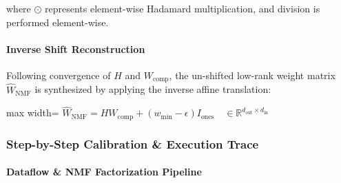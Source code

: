 where $\odot$ represents element-wise Hadamard multiplication, and division is performed element-wise.

\paragraph{Inverse Shift Reconstruction}
Following convergence of $H$ and $W_{\text{comp}}$, the un-shifted low-rank weight matrix $\hat{W}_{\text{NMF}}$ is synthesized by applying the inverse affine translation:

\begin{center}
\begin{adjustbox}{max width=\columnwidth}
$\displaystyle
\hat{W}_{\text{NMF}} = H W_{\text{comp}} + (w_{\min} - \epsilon) I_{\text{ones}} \quad \in \mathbb{R}^{d_{\text{out}} \times d_{\text{in}}}
$
\end{adjustbox}
\end{center}


\subsubsection*{Step-by-Step Calibration \& Execution Trace}

\paragraph{Dataflow \& NMF Factorization Pipeline}

